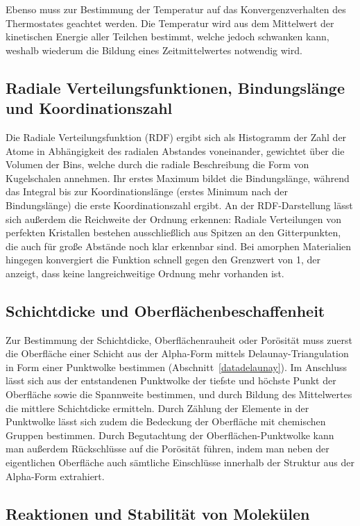 Ebenso muss zur Bestimmung der Temperatur auf das Konvergenzverhalten des Thermostates geachtet werden.
Die Temperatur wird aus dem Mittelwert der kinetischen Energie aller Teilchen bestimmt, welche jedoch schwanken kann, weshalb wiederum die Bildung eines Zeitmittelwertes notwendig wird.

\subsection{Radiale Verteilungsfunktionen, Bindungslänge und Koordinationszahl}

Die Radiale Verteilungsfunktion (RDF) ergibt sich als Histogramm der Zahl der Atome in Abhängigkeit des radialen Abstandes voneinander, gewichtet über die Volumen der Bins, welche durch die radiale Beschreibung die Form von Kugelschalen annehmen.
Ihr erstes Maximum bildet die Bindungslänge, während das Integral bis zur Koordinationslänge (erstes Minimum nach der Bindungslänge) die erste Koordinationszahl ergibt.
An der RDF-Darstellung lässt sich außerdem die Reichweite der Ordnung erkennen:
Radiale Verteilungen von perfekten Kristallen bestehen ausschließlich aus Spitzen an den Gitterpunkten, die auch für große Abstände noch klar erkennbar sind.
Bei amorphen Materialien hingegen konvergiert die Funktion schnell gegen den Grenzwert von 1, der anzeigt, dass keine langreichweitige Ordnung mehr vorhanden ist.

\subsection{Schichtdicke und Oberflächenbeschaffenheit}

Zur Bestimmung der Schichtdicke, Oberflächenrauheit oder Porösität muss zuerst die Oberfläche einer Schicht aus der Alpha-Form mittels Delaunay-Triangulation in Form einer Punktwolke bestimmen (Abschnitt~\ref{datadelaunay}).
Im Anschluss lässt sich aus der entstandenen Punktwolke der tiefste und höchste Punkt der Oberfläche sowie die Spannweite bestimmen, und durch Bildung des Mittelwertes die mittlere Schichtdicke ermitteln.
Durch Zählung der Elemente in der Punktwolke lässt sich zudem die Bedeckung der Oberfläche mit chemischen Gruppen bestimmen.
Durch Begutachtung der Oberflächen-Punktwolke kann man außerdem Rückschlüsse auf die Porösität führen, indem man neben der eigentlichen Oberfläche auch sämtliche Einschlüsse innerhalb der Struktur aus der Alpha-Form extrahiert.

\subsection{Reaktionen und Stabilität von Molekülen}


